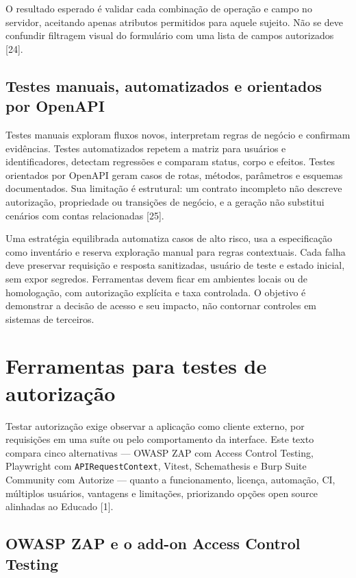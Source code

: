 O resultado esperado é validar cada combinação de operação e campo no
servidor, aceitando apenas atributos permitidos para aquele sujeito. Não
se deve confundir filtragem visual do formulário com uma lista de campos
autorizados {[}24{]}.

\subsection{Testes manuais, automatizados e orientados por
OpenAPI}\label{testes-manuais-automatizados-e-orientados-por-openapi}

Testes manuais exploram fluxos novos, interpretam regras de negócio e
confirmam evidências. Testes automatizados repetem a matriz para
usuários e identificadores, detectam regressões e comparam status, corpo
e efeitos. Testes orientados por OpenAPI geram casos de rotas, métodos,
parâmetros e esquemas documentados. Sua limitação é estrutural: um
contrato incompleto não descreve autorização, propriedade ou transições
de negócio, e a geração não substitui cenários com contas relacionadas
{[}25{]}.

Uma estratégia equilibrada automatiza casos de alto risco, usa a
especificação como inventário e reserva exploração manual para regras
contextuais. Cada falha deve preservar requisição e resposta
sanitizadas, usuário de teste e estado inicial, sem expor segredos.
Ferramentas devem ficar em ambientes locais ou de homologação, com
autorização explícita e taxa controlada. O objetivo é demonstrar a
decisão de acesso e seu impacto, não contornar controles em sistemas de
terceiros.

\section{Ferramentas para testes de
autorização}\label{ferramentas-para-testes-de-autorizauxe7uxe3o}

Testar autorização exige observar a aplicação como cliente externo, por
requisições em uma suíte ou pelo comportamento da interface. Este texto
compara cinco alternativas --- OWASP ZAP com Access Control Testing,
Playwright com \texttt{APIRequestContext}, Vitest, Schemathesis e Burp
Suite Community com Autorize --- quanto a funcionamento, licença,
automação, CI, múltiplos usuários, vantagens e limitações, priorizando
opções open source alinhadas ao Educado {[}1{]}.

\subsection{OWASP ZAP e o add-on Access Control
Testing}\label{owasp-zap-e-o-add-on-access-control-testing}

